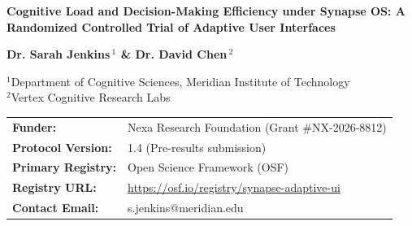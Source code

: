 \begin{center}
  \vspace*{1.0cm}
  
  \begin{tcolorbox}[elegantbox, colback=primary!5, colframe=primary!20, halign=center]
    \color{primary}\sffamily\LARGE\bfseries Cognitive Load and Decision-Making Efficiency under Synapse OS: A Randomized Controlled Trial of Adaptive User Interfaces
  \end{tcolorbox}
  
  \vspace{1.0cm}
  
  {\sffamily\large\bfseries Dr. Sarah Jenkins\,$^{1}$ \quad \& \quad Dr. David Chen\,$^{2}$}
  
  \vspace{0.6cm}
  
  {\sffamily\small
  $^{1}$Department of Cognitive Sciences, Meridian Institute of Technology \\
  $^{2}$Vertex Cognitive Research Labs
  }
  
  \vspace{1.0cm}
  
  \begin{tabular}{ll}
    \textbf{Funder:} & Nexa Research Foundation (Grant \#NX-2026-8812) \\
    \textbf{Protocol Version:} & 1.4 (Pre-results submission) \\
    \textbf{Primary Registry:} & Open Science Framework (OSF) \\
    \textbf{Registry URL:} & \url{https://osf.io/registry/synapse-adaptive-ui} \\
    \textbf{Contact Email:} & s.jenkins@meridian.edu
  \end{tabular}
  
\end{center}
